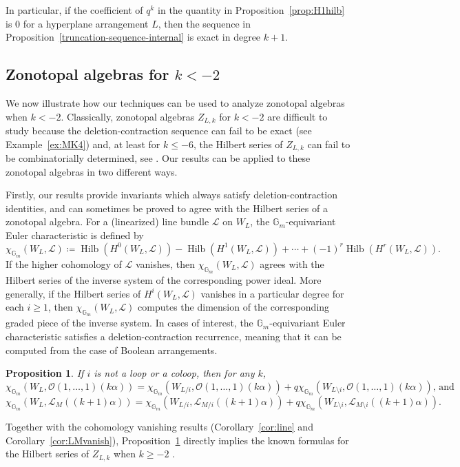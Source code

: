 \documentclass{amsart}
\newtheorem{proposition}[theorem]{Proposition}
\theoremstyle{definition}
\begin{document}
In particular, if the coefficient of $q^k$ in the quantity in Proposition~\ref{prop:H1hilb} is $0$ for a hyperplane arrangement $L$, then the sequence in Proposition~\ref{truncation-sequence-internal} is exact in degree $k+1$. 



\subsection{Zonotopal algebras for $k < -2$}

We now illustrate how our techniques can be used to analyze zonotopal algebras when $k < -2$. Classically, zonotopal algebras $Z_{L, k}$ for $k < -2$ are difficult to study because the deletion-contraction sequence can fail to be exact (see Example~\ref{ex:MK4}) and, at least for $k \le -6$, the Hilbert series of $Z_{L, k}$ can fail to be combinatorially determined, see \cite[Proposition 4]{APCorrection}. Our results can be applied to these zonotopal algebras in two different ways. 

Firstly, our results provide invariants which always satisfy deletion-contraction identities, and can sometimes be proved to agree with the Hilbert series of a zonotopal algebra. For a (linearized) line bundle $\mathcal{L}$ on $W_L$, the $\mathbb{G}_m$-equivariant Euler characteristic is defined by
$$\chi_{\mathbb{G}_m}(W_L, \mathcal{L}) \coloneqq \operatorname{Hilb}(H^0(W_L, \mathcal{L})) - \operatorname{Hilb}(H^1(W_L, \mathcal{L})) + \dotsb + (-1)^r \operatorname{Hilb}(H^r(W_L, \mathcal{L})).$$
If the higher cohomology of $\mathcal{L}$ vanishes, then $\chi_{\mathbb{G}_m}(W_L, \mathcal{L})$ agrees with the Hilbert series of the inverse system of the corresponding power ideal. More generally, if the Hilbert series of $H^i(W_L, \mathcal{L})$ vanishes in a particular degree for each $i \ge 1$, then $\chi_{\mathbb{G}_m}(W_L, \mathcal{L})$ computes the dimension of the corresponding graded piece of the inverse system. In cases of interest, the $\mathbb{G}_m$-equivariant Euler characteristic satisfies a deletion-contraction recurrence, meaning that it can be computed from the case of Boolean arrangements. 

\begin{proposition}\label{prop:euleradd}
If $i$ is not a loop or a coloop, then for any $k$,
$$\chi_{\mathbb{G}_m}(W_L, \mathcal{O}(1, \dotsc, 1)(k\alpha)) = \chi_{\mathbb{G}_m}(W_{L/i}, \mathcal{O}(1, \dotsc, 1)(k \alpha)) + q \chi_{\mathbb{G}_m}(W_{L \setminus i}, \mathcal{O}(1, \dotsc, 1)(k\alpha)) \text{, and}$$
$$\chi_{\mathbb{G}_m}(W_L, \mathcal{L}_M((k+1)\alpha)) = \chi_{\mathbb{G}_m}(W_{L/i}, \mathcal{L}_{M/i}((k+1)\alpha)) + q \chi_{\mathbb{G}_m}(W_{L \setminus i}, \mathcal{L}_{M \setminus i}((k+1)\alpha)).$$
\end{proposition}
Together with the cohomology vanishing results (Corollary~\ref{cor:line} and Corollary~\ref{cor:LMvanish}), Proposition~\ref{prop:euleradd} directly implies the known formulas for the Hilbert series of $Z_{L, k}$ when $k \ge -2$ \cite{ArdilaPostnikov,HoltzRon}. 
\end{document}
